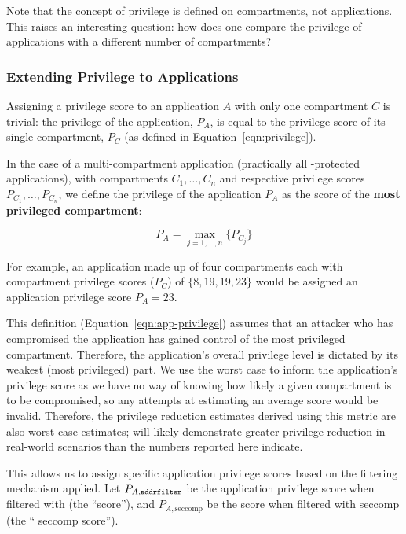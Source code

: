 Note that the concept of privilege is defined on compartments, not applications.
This raises an interesting question: how does one compare the privilege of
applications with a different number of compartments?

\subsubsection{Extending Privilege to Applications}\label{subsubsec:eval-quant-priv-apps}

Assigning a privilege score to an application $A$ with only one compartment $C
$ is trivial: the privilege of the application, $P_A$, is equal to the
privilege score of its single compartment, $P_C$ (as defined in 
Equation~\ref{eqn:privilege}). 

In the case of a multi-compartment application (practically all \af-protected
applications), with compartments $C_1, \dots, C_n$ and respective
privilege scores $P_{C_1}, \dots, P_{C_n}$, we define the privilege of the
application $P_A$ as the score of the \textbf{most privileged compartment}: 

\begin{equation} \label{eqn:app-privilege} 
    P_A = \max_{j=1,\dots,n} \{ P_{C_j} \} 
\end{equation} 

For example, an application made up of four compartments each
with compartment privilege scores ($P_C$) of $\{8, 19, 19, 23\}$ would be
assigned an application privilege score $P_A = 23$.

This definition (Equation~\ref{eqn:app-privilege}) assumes that an attacker who
has compromised the application has gained control of the most privileged
compartment. Therefore, the application's overall privilege level is
dictated by its weakest (most privileged) part. We use the worst case to
inform the application's privilege score as we have no way of knowing how
likely a given compartment is to be compromised, so any attempts at
estimating an average score would be invalid. Therefore, the privilege
reduction estimates derived using this metric are also worst case estimates;
\af will likely demonstrate greater privilege reduction in real-world
scenarios than the numbers reported here indicate. 

This allows us to assign specific application privilege scores based on the
filtering mechanism applied. Let $P_{A, \text{\texttt{addrfilter}}}$ be the application
privilege score when filtered with \af (the ``\af score''), and 
$P_{A, \text{seccomp}}$ be the score when filtered with seccomp (the ``
seccomp score''). 

